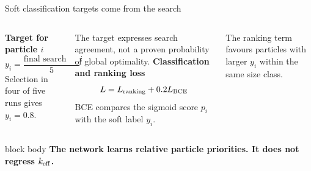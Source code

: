 \documentclass[aspectratio=169,11pt]{beamer}
\newcommand{\hi}[1]{\textcolor{tumblue}{\textbf{#1}}}
\newcommand{\result}[1]{\par%
  \begin{beamercolorbox}[rounded=true,sep=0.55em]{block body}
  \centering\color{tumdark}\textbf{#1}
  \end{beamercolorbox}}
\begin{document}
\begin{frame}{Soft classification targets come from the search}
\small
\begin{columns}[T,onlytextwidth]
\hi{Target for particle $i$}
\[y_i=\frac{\text{final search runs selecting }i}{5}\]
Selection in four of five runs gives $y_i=0.8$.
\par\vspace{.25cm}
The target expresses search agreement, not a proven probability of global optimality.
\hi{Classification and ranking loss}
\[L=L_{\rm ranking}+0.2L_{\rm BCE}\]
BCE compares the sigmoid score $p_i$ with the soft label $y_i$.
\par\vspace{.2cm}
The ranking term favours particles with larger $y_i$ within the same size class.
\end{columns}
\vspace{.3cm}
\result{The network learns relative particle priorities. It does not regress $k_{\rm eff}$.}
\end{frame}
\end{document}

